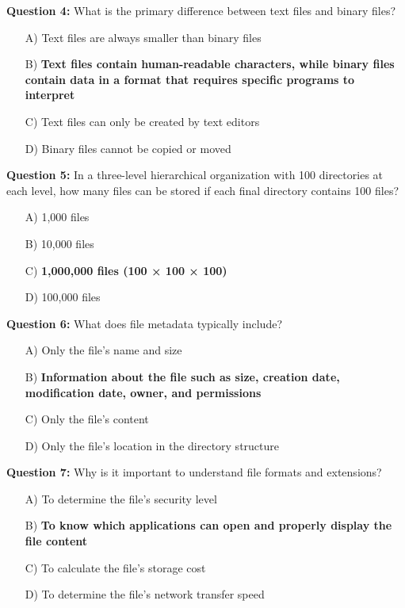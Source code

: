 \textbf{Question 4:} What is the primary difference between text files and binary files?

\begin{enumerate}
    \item[A)] Text files are always smaller than binary files
    \item[B)] \textbf{Text files contain human-readable characters, while binary files contain data in a format that requires specific programs to interpret}
    \item[C)] Text files can only be created by text editors
    \item[D)] Binary files cannot be copied or moved
\end{enumerate}

\textbf{Question 5:} In a three-level hierarchical organization with 100 directories at each level, how many files can be stored if each final directory contains 100 files?

\begin{enumerate}
    \item[A)] 1,000 files
    \item[B)] 10,000 files
    \item[C)] \textbf{1,000,000 files (100 × 100 × 100)}
    \item[D)] 100,000 files
\end{enumerate}

\textbf{Question 6:} What does file metadata typically include?

\begin{enumerate}
    \item[A)] Only the file's name and size
    \item[B)] \textbf{Information about the file such as size, creation date, modification date, owner, and permissions}
    \item[C)] Only the file's content
    \item[D)] Only the file's location in the directory structure
\end{enumerate}

\textbf{Question 7:} Why is it important to understand file formats and extensions?

\begin{enumerate}
    \item[A)] To determine the file's security level
    \item[B)] \textbf{To know which applications can open and properly display the file content}
    \item[C)] To calculate the file's storage cost
    \item[D)] To determine the file's network transfer speed
\end{enumerate}

